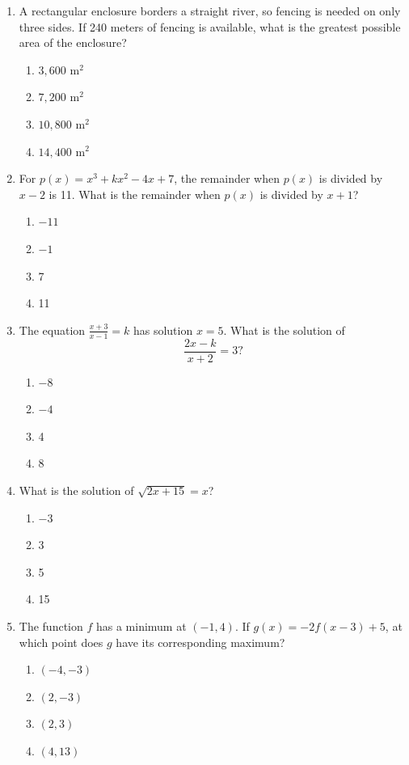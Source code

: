 \documentclass[12pt]{article}
\begin{document}
\begin{enumerate}[leftmargin=*,itemsep=1.15em]
  \item A rectangular enclosure borders a straight river, so fencing is needed on only three sides. If 240 meters of fencing is available, what is the greatest possible area of the enclosure?
  \begin{enumerate}[label=\Alph*.,itemsep=0pt]
    \item $3,600\text{ m}^2$ \item $7,200\text{ m}^2$
    \item $10,800\text{ m}^2$ \item $14,400\text{ m}^2$
  \end{enumerate}

  \item For $p(x)=x^3+kx^2-4x+7$, the remainder when $p(x)$ is divided by $x-2$ is 11. What is the remainder when $p(x)$ is divided by $x+1$?
  \begin{enumerate}[label=\Alph*.,itemsep=0pt]
    \item $-11$ \item $-1$ \item 7 \item 11
  \end{enumerate}

  \item The equation $\frac{x+3}{x-1}=k$ has solution $x=5$. What is the solution of
  \[
    \frac{2x-k}{x+2}=3?
  \]
  \begin{enumerate}[label=\Alph*.,itemsep=0pt]
    \item $-8$ \item $-4$ \item 4 \item 8
  \end{enumerate}

  \item What is the solution of $\sqrt{2x+15}=x$?
  \begin{enumerate}[label=\Alph*.,itemsep=0pt]
    \item $-3$ \item 3 \item 5 \item 15
  \end{enumerate}

  \item The function $f$ has a minimum at $(-1,4)$. If $g(x)=-2f(x-3)+5$, at which point does $g$ have its corresponding maximum?
  \begin{enumerate}[label=\Alph*.,itemsep=0pt]
    \item $(-4,-3)$ \item $(2,-3)$ \item $(2,3)$ \item $(4,13)$
  \end{enumerate}


\end{enumerate}
\end{document}
